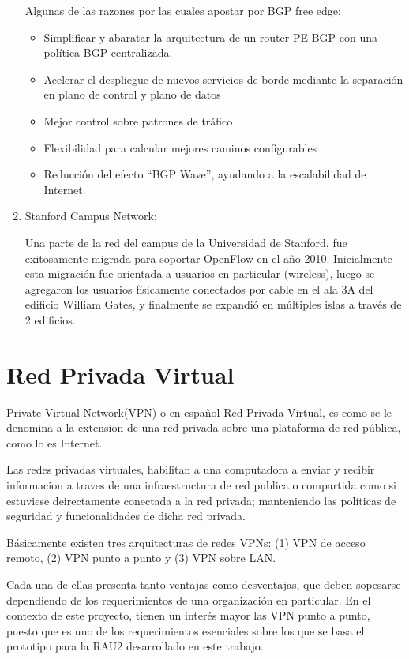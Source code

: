 \begin{enumerate}
Algunas de las razones por las cuales apostar por BGP free edge:
\begin{itemize}
\item Simplificar y abaratar la arquitectura de un router PE-BGP con una política BGP centralizada.
\item Acelerar el despliegue de nuevos servicios de borde mediante la separación en plano de control y plano de datos
\item Mejor control sobre patrones de tráfico
\item Flexibilidad para calcular mejores caminos configurables
\item Reducción del efecto ``BGP Wave'', ayudando a la escalabilidad de Internet.
\end{itemize}

\item Stanford Campus Network:

Una parte de la red del campus de la Universidad de Stanford, fue exitosamente migrada para soportar OpenFlow en el año 2010.
Inicialmente esta migración fue orientada a usuarios en particular (wireless), luego se agregaron los usuarios físicamente conectados por cable en el ala 3A del edificio William Gates, y finalmente se expandió en múltiples islas a través de 2 edificios.

\end{enumerate}

\section{Red Privada Virtual}
\label{section2.7}


Private Virtual Network(VPN) o en español Red Privada Virtual, es como se le denomina a la extension de una red privada sobre una plataforma de red p\'ublica, como lo es Internet.

Las redes privadas virtuales, habilitan a una computadora a enviar y recibir informacion a traves de una infraestructura de red publica o compartida como si estuviese deirectamente conectada a la red privada; manteniendo las políticas de seguridad y funcionalidades de dicha red privada.

Básicamente existen tres arquitecturas de redes VPNs: (1) VPN de acceso remoto, (2) VPN punto a punto y (3) VPN sobre LAN.

Cada una de ellas presenta tanto ventajas como desventajas, que deben sopesarse dependiendo de los requerimientos de una organización en particular. En el contexto de este proyecto, tienen un interés mayor las VPN punto a punto, puesto que es uno de los requerimientos esenciales sobre los que se basa el prototipo para la RAU2 desarrollado en este trabajo.

